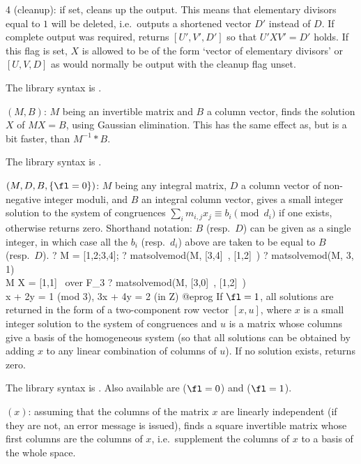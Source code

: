 4 (cleanup): if set, cleans up the output. This means that elementary
divisors equal to $1$ will be deleted, i.e.~outputs a shortened vector $D'$
instead of $D$. If complete output was required, returns $[U',V',D']$ so
that $U'XV' = D'$ holds. If this flag is set, $X$ is allowed to be of the
form `vector of elementary divisors' or $[U,V,D]$ as would normally be output with the cleanup flag
unset.

The library syntax is .

$(M,B)$: \label{se:matsolve}$M$ being an invertible matrix and $B$ a column
vector, finds the solution $X$ of $MX=B$, using Gaussian elimination. This
has the same effect as, but is a bit faster, than $M^{-1}*B$.

The library syntax is .

$(M,D,B,\{\fl=0\})$: \label{se:matsolvemod}$M$ being any integral matrix,
$D$ a column vector of non-negative integer moduli, and $B$ an integral
column vector, gives a small integer solution to the system of congruences
$\sum_i m_{i,j}x_j\equiv b_i\pmod{d_i}$ if one exists, otherwise returns
zero. Shorthand notation: $B$ (resp.~$D$) can be given as a single integer,
in which case all the $b_i$ (resp.~$d_i$) above are taken to be equal to $B$
(resp.~$D$).
\bprog
? M = [1,2;3,4];
? matsolvemod(M, [3,4]~, [1,2]~)
? matsolvemod(M, 3, 1) \\ M X = [1,1]~ over F_3
? matsolvemod(M, [3,0]~, [1,2]~) \\ x + 2y = 1 (mod 3), 3x + 4y = 2 (in Z)
@eprog
If $\fl=1$, all solutions are returned in the form of a two-component row
vector $[x,u]$, where $x$ is a small integer solution to the system of
congruences and $u$ is a matrix whose columns give a basis of the homogeneous
system (so that all solutions can be obtained by adding $x$ to any linear
combination of columns of $u$). If no solution exists, returns zero.

The library syntax is .
Also available are 
($\fl=0$) and  ($\fl=1$).

$(x)$: \label{se:matsupplement}assuming that the columns of the matrix $x$
are linearly independent (if they are not, an error message is issued), finds
a square invertible matrix whose first columns are the columns of $x$,
i.e.~supplement the columns of $x$ to a basis of the whole space.

